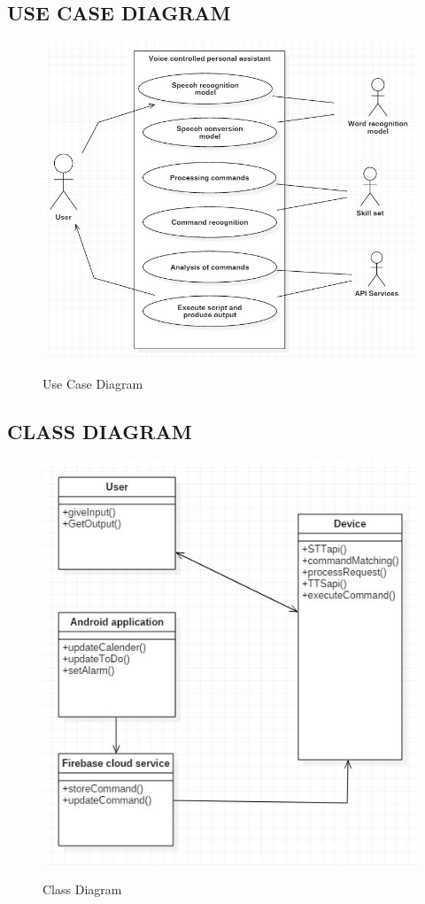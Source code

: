 \documentclass[12pt]{extreport}
\begin{document}
    \subsection{USE CASE DIAGRAM}
    \begin{figure}[H]
    \centering
  \includegraphics[scale=0.75]{UseCase.JPG}\\
  \caption{Use Case Diagram}
  \end{figure}
    \pagebreak
    
        \subsection{CLASS DIAGRAM}
    \begin{figure}[H]
    \centering
  \includegraphics[scale=0.75]{Class.JPG}\\
  \caption{Class Diagram}
\end{figure}
\end{document}
